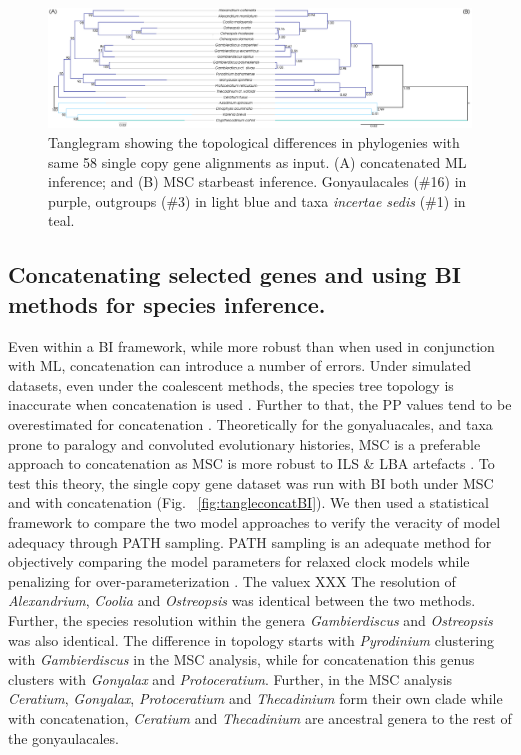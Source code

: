 \documentclass[12pt]{article}
\begin{document}
\begin{figure} 
\includegraphics[scale=.2]{figures/MSC-BI_vs_singlecopy-concat-ML.png} 
\caption{Tanglegram showing the topological differences in phylogenies with same 58 single copy gene alignments as input. (A) concatenated ML inference; and (B) MSC starbeast inference. Gonyaulacales (\#16) in purple, outgroups (\#3) in light blue and taxa \textit{incertae sedis} (\#1) in teal.} 
\label{fig:tangleconcatML}
\end{figure} 
\FloatBarrier

\subsection*{Concatenating selected genes and using BI methods for species inference.}
\FloatBarrier
Even within a BI framework, while more robust than when used in conjunction with ML, concatenation can introduce a number of errors. 
Under simulated datasets, even under the coalescent methods, the species tree topology is inaccurate when concatenation is used \cite{kubatko2007inconsistency}. 
Further to that, the PP values tend to be overestimated for concatenation \cite{suzuki2002overcredibility}. 
Theoretically for the gonyaluacales, and taxa prone to paralogy and convoluted evolutionary histories, MSC is a preferable approach to concatenation as MSC is more robust to ILS \& LBA artefacts \cite{liu2014coalescent}. 
To test this theory, the single copy gene dataset was run with BI both under MSC and with concatenation (Fig. ~\ref{fig:tangleconcatBI}). 
We then used a statistical framework to compare the two model approaches to verify the veracity of model adequacy through PATH sampling. 
PATH sampling is an adequate method for objectively comparing the model parameters for relaxed clock models while penalizing for over-parameterization \cite{baele2012accurate}. 
The valuex XXX %
The resolution of \textit{Alexandrium}, \textit{Coolia} and \textit{Ostreopsis} was identical between the two methods. 
Further, the species resolution within the genera \textit{Gambierdiscus} and \textit{Ostreopsis} was also identical. 
The difference in topology starts with \textit{Pyrodinium} clustering with \textit{Gambierdiscus} in the MSC analysis, while for concatenation this genus clusters with \textit{Gonyalax} and \textit{Protoceratium}. 
Further, in the MSC analysis \textit{Ceratium}, \textit{Gonyalax}, \textit{Protoceratium} and \textit{Thecadinium} form their own clade while with concatenation, \textit{Ceratium} and \textit{Thecadinium} are ancestral genera to the rest of the gonyaulacales. 
\end{document}
